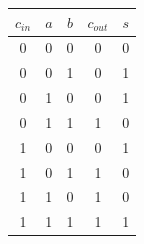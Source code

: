 \begin{tabular}{ccc|cc}\toprule
$c_{in}$&$a$&$b$&$c_{out}$&$s$\\\midrule
0&0&0&0&0\\0&0&1&0&1\\0&1&0&0&1\\0&1&1&1&0\\
1&0&0&0&1\\1&0&1&1&0\\1&1&0&1&0\\1&1&1&1&1\\\bottomrule
\end{tabular}